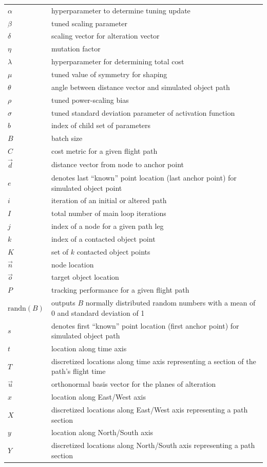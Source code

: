 \documentclass[conf]{new-aiaa}
\begin{document}
{\renewcommand\arraystretch{1.0}
\noindent\begin{longtable*}{@{}l @{\quad=\quad} l@{}}
$\alpha$ & hyperparameter to determine tuning update \\
$\beta$  & tuned scaling parameter \\
$\delta$ & scaling vector for alteration vector \\
$\eta$ & mutation factor \\
$\lambda$ & hyperparameter for determining total cost \\
$\mu$ & tuned value of symmetry for shaping \\
$\theta$ & angle between distance vector and simulated object path \\
$\rho$ & tuned power-scaling bias \\
$\sigma$ & tuned standard deviation parameter of activation function \\
$b$ & index of child set of parameters \\
$B$ & batch size \\
$C$ & cost metric for a given flight path \\
$\vec{d}$ & distance vector from node to anchor point\\
$e$ & denotes last ``known'' point location (last anchor point) for simulated object point \\
$i$ & iteration of an initial or altered path \\
$I$ & total number of main loop iterations \\
$j$ & index of a node for a given path leg \\
$k$ & index of a contacted object point \\
$K$ & set of $k$ contacted object points \\
$\vec{n}$ & node location \\
$\vec{o}$ & target object location \\
$P$ & tracking performance for a given flight path \\
$\mbox{randn}(B)$ & outputs $B$ normally distributed random numbers with a mean of 0 and standard deviation of 1 \\
$s$ & denotes first ``known'' point location (first anchor point) for simulated object path \\
$t$ & location along time axis \\
$T$ & discretized locations along time axis representing a section of the path's flight time \\
$\vec{u}$ & orthonormal basis vector for the planes of alteration \\
$x$ & location along East/West axis \\
$X$ & discretized locations along East/West axis representing a path section \\
$y$ & location along North/South axis \\
$Y$ & discretized locations along North/South axis representing a path section \\
\end{longtable*}}
\end{document}
